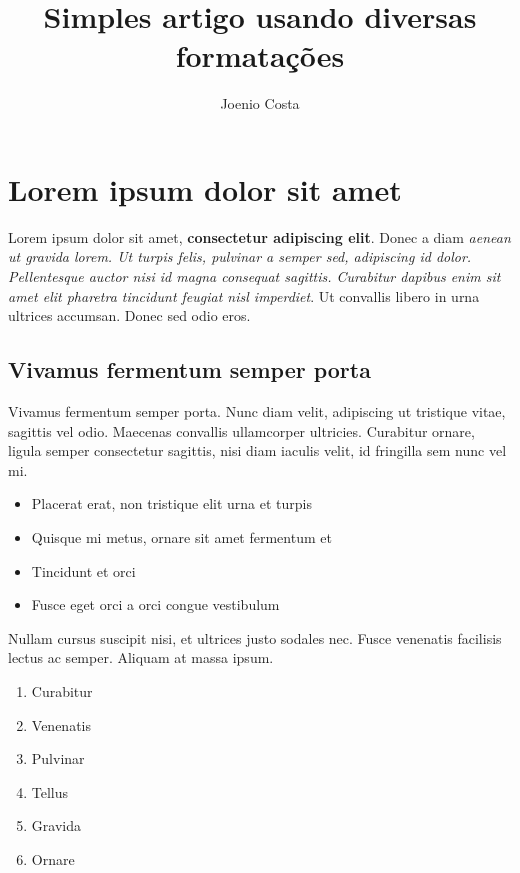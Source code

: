 \documentclass{article}
\begin{document}
\title{Simples artigo usando diversas formatações}

\author{Joenio Costa}

\maketitle

\tableofcontents

\section{Lorem ipsum dolor sit amet}

Lorem ipsum dolor sit amet, {\bf consectetur adipiscing elit}. Donec a diam
{\it aenean ut gravida lorem. Ut turpis felis, pulvinar a semper sed,
adipiscing id dolor.  Pellentesque auctor nisi id magna consequat sagittis.
Curabitur dapibus enim sit amet elit pharetra tincidunt feugiat nisl
imperdiet}. Ut convallis libero in urna ultrices accumsan. Donec sed odio
eros.

\subsection{Vivamus fermentum semper porta}

Vivamus fermentum semper porta. Nunc diam velit, adipiscing ut tristique
vitae, sagittis vel odio. Maecenas convallis ullamcorper ultricies. Curabitur
ornare, ligula semper consectetur sagittis, nisi diam iaculis velit, id
fringilla sem nunc vel mi.

\begin{itemize}
  \item Placerat erat, non tristique elit urna et turpis
  \item Quisque mi metus, ornare sit amet fermentum et
  \item Tincidunt et orci
  \item Fusce eget orci a orci congue vestibulum
\end{itemize}

Nullam cursus suscipit nisi, et ultrices justo sodales nec. Fusce venenatis
facilisis lectus ac semper. Aliquam at massa ipsum.

\begin{enumerate}
  \item Curabitur
  \item Venenatis
  \item Pulvinar
  \item Tellus
  \item Gravida
  \item Ornare
\end{enumerate}
\end{document}
